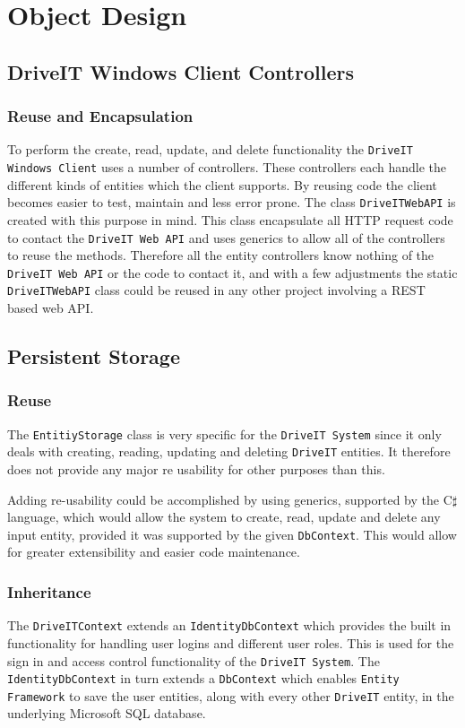 \section{Object Design}
\subsection{DriveIT Windows Client Controllers}
\subsubsection{Reuse and Encapsulation}
To perform the create, read, update, and delete functionality the \texttt{DriveIT Windows Client} uses a number of controllers. These controllers each handle the different kinds of entities which the client supports. By reusing code the client becomes easier to test, maintain and less error prone. The class \texttt{DriveITWebAPI} is created with this purpose in mind. This class encapsulate all HTTP request code to contact the \texttt{DriveIT Web API} and uses generics to allow all of the controllers to reuse the methods. 
Therefore all the entity controllers know nothing of the \texttt{DriveIT Web API} or the code to contact it, and with a few adjustments the static \texttt{DriveITWebAPI} class could be reused in any other project involving a REST based web API.

\subsection{Persistent Storage}

\subsubsection{Reuse}
The \texttt{EntitiyStorage} class is very specific for the \texttt{DriveIT System} since it only deals with creating, reading, updating and deleting \texttt{DriveIT} entities. It therefore does not provide any major re usability for other purposes than this. 

Adding re-usability could be accomplished by using generics, supported by the C$\sharp$ language, which would allow the system to create, read, update and delete any input entity, provided it was supported by the given \texttt{DbContext}. This would allow for greater extensibility and easier code maintenance.

\subsubsection{Inheritance}
The \texttt{DriveITContext} extends an \texttt{IdentityDbContext} which provides the built in functionality for handling user logins and different user roles. This is used for the sign in and access control functionality of the \texttt{DriveIT System}.
The \texttt{IdentityDbContext} in turn extends a \texttt{DbContext} which enables \texttt{Entity Framework} to save the user entities, along with every other \texttt{DriveIT} entity, in the underlying Microsoft SQL database.

